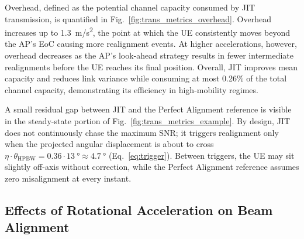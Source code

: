 \documentclass[fleqn,10pt]{wlscirep}
\newcommand{\rev}[1]{{\color{revblue}#1}}
\begin{document}
Overhead, defined as the potential channel capacity consumed by JIT transmission, is quantified in Fig.~\ref{fig:trans_metrics_overhead}. Overhead increases up to \SI{1.3}{m/s^2}, the point at which the UE consistently moves beyond the AP's EoC causing more realignment events. At higher accelerations, however, overhead decreases as the AP's look-ahead strategy results in fewer intermediate realignments before the UE reaches its final position. Overall, JIT improves mean capacity and reduces link variance while consuming at most 0.26\% of the total channel capacity, demonstrating its efficiency in high-mobility regimes.

\rev{A small residual gap between JIT and the Perfect Alignment reference is visible in the steady-state portion of Fig.~\ref{fig:trans_metrics_example}. By design, JIT does not continuously chase the maximum SNR; it triggers realignment only when the projected angular displacement is about to cross $\eta \cdot \theta_{\text{HPBW}} = 0.36 \cdot \SI{13}{\degree} \approx \SI{4.7}{\degree}$ (Eq.~\ref{eq:trigger}). Between triggers, the UE may sit slightly off-axis without correction, while the Perfect Alignment reference assumes zero misalignment at every instant.}



\subsection*{Effects of Rotational Acceleration on Beam Alignment}
\end{document}
